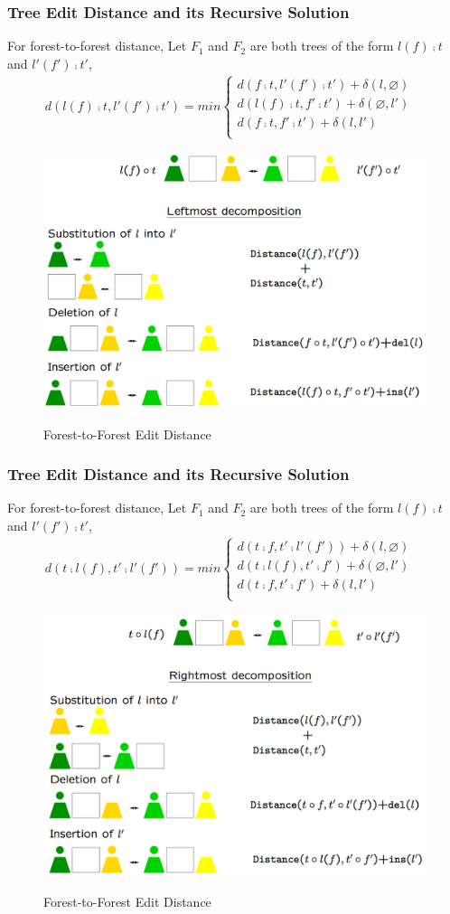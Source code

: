 \documentclass{beamer}
\begin{document}
\begin{frame}
\frametitle{Tree Edit Distance and its Recursive Solution}
For forest-to-forest distance,
Let $F_1$ and $F_2$ are both trees of the form $l(f) \comp t$ and $l'(f') \comp t'$, 
\begin{align*}
d(l(f) \comp t, l'(f') \comp t') = min \begin{cases}
	  	d(f \comp t, l'(f') \comp t') + \delta(l, \varnothing) \\ 
      	d(l(f) \comp t, f' \comp t') + \delta(\varnothing, l') \\ 
    	d(f \comp t, f' \comp t') + \delta(l, l') & \\
    \end{cases}
\end{align*}
\begin{figure}
	\includegraphics[width=0.6\linewidth]{ForestLeftmostDecomposition}
	\label{Forest-to-Forest Edit Distance} 
	\caption{Forest-to-Forest Edit Distance}
	\centering
\end{figure}
\end{frame}
\begin{frame}
\frametitle{Tree Edit Distance and its Recursive Solution}
For forest-to-forest distance,
Let $F_1$ and $F_2$ are both trees of the form $l(f) \comp t$ and $l'(f') \comp t'$, 
\begin{align*}
d(t \comp l(f), t' \comp l'(f')) = min \begin{cases}
	  	d(t  \comp f, t' \comp l'(f')) + \delta(l, \varnothing) \\ 
      	d(t \comp l(f), t'  \comp f') + \delta(\varnothing, l') \\ 
    	d(t \comp f, t' \comp f') + \delta(l, l') & \\
    \end{cases}
\end{align*}
\begin{figure}
	\includegraphics[width=0.55\linewidth]{ForestRightmostDecomposition}
	\label{Forest-to-Forest Edit Distance} 
	\caption{Forest-to-Forest Edit Distance}
	\centering
\end{figure}
\end{frame}
\end{document}
